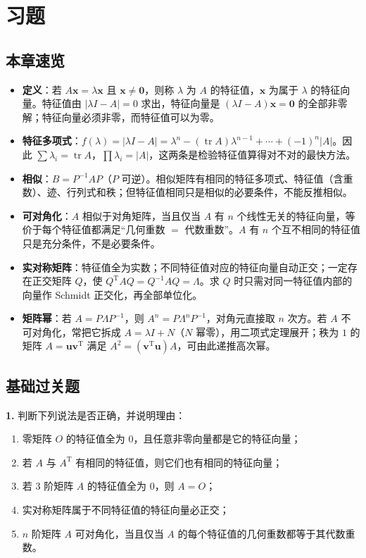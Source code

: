 \section{习题}

\subsection{本章速览}

\begin{itemize}
  \item \textbf{定义}：若 \(A\mathbf{x}=\lambda\mathbf{x}\) 且 \(\mathbf{x}\neq\mathbf{0}\)，则称 \(\lambda\) 为 \(A\) 的特征值，\(\mathbf{x}\) 为属于 \(\lambda\) 的特征向量。特征值由 \(|\lambda I-A|=0\) 求出，特征向量是 \((\lambda I-A)\mathbf{x}=\mathbf{0}\) 的全部非零解；特征向量必须非零，而特征值可以为零。
  \item \textbf{特征多项式}：\(f(\lambda)=|\lambda I-A|=\lambda^n-(\operatorname{tr}A)\lambda^{n-1}+\cdots+(-1)^n|A|\)。因此 \(\sum\lambda_i=\operatorname{tr}A\)，\(\prod\lambda_i=|A|\)，这两条是检验特征值算得对不对的最快方法。
  \item \textbf{相似}：\(B=P^{-1}AP\)（\(P\) 可逆）。相似矩阵有相同的特征多项式、特征值（含重数）、迹、行列式和秩；但特征值相同只是相似的必要条件，不能反推相似。
  \item \textbf{可对角化}：\(A\) 相似于对角矩阵，当且仅当 \(A\) 有 \(n\) 个线性无关的特征向量，等价于每个特征值都满足“几何重数 \(=\) 代数重数”。\(A\) 有 \(n\) 个互不相同的特征值只是充分条件，不是必要条件。
  \item \textbf{实对称矩阵}：特征值全为实数；不同特征值对应的特征向量自动正交；一定存在正交矩阵 \(Q\)，使 \(Q^{\mathrm{T}}AQ=Q^{-1}AQ=\Lambda\)。求 \(Q\) 时只需对同一特征值内部的向量作 Schmidt 正交化，再全部单位化。
  \item \textbf{矩阵幂}：若 \(A=P\Lambda P^{-1}\)，则 \(A^n=P\Lambda^nP^{-1}\)，对角元直接取 \(n\) 次方。若 \(A\) 不可对角化，常把它拆成 \(A=\lambda I+N\)（\(N\) 幂零），用二项式定理展开；秩为 \(1\) 的矩阵 \(A=\mathbf{u}\mathbf{v}^{\mathrm{T}}\) 满足 \(A^2=(\mathbf{v}^{\mathrm{T}}\mathbf{u})A\)，可由此递推高次幂。
\end{itemize}

\subsection{基础过关题}

\textbf{1.} 判断下列说法是否正确，并说明理由：
\begin{enumerate}[label=(\arabic*)]
  \item 零矩阵 \(O\) 的特征值全为 \(0\)，且任意非零向量都是它的特征向量；
  \item 若 \(A\) 与 \(A^{\mathrm{T}}\) 有相同的特征值，则它们也有相同的特征向量；
  \item 若 \(3\) 阶矩阵 \(A\) 的特征值全为 \(0\)，则 \(A=O\)；
  \item 实对称矩阵属于不同特征值的特征向量必正交；
  \item \(n\) 阶矩阵 \(A\) 可对角化，当且仅当 \(A\) 的每个特征值的几何重数都等于其代数重数。
\end{enumerate}


